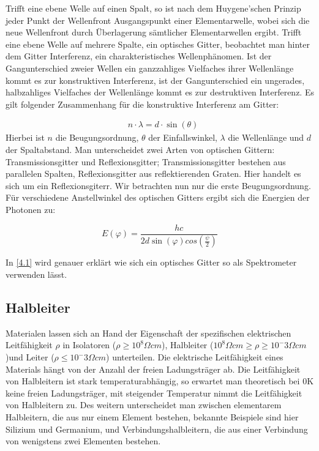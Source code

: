 \documentclass[12pt]{article}
\begin{document}
Trifft eine ebene Welle auf einen Spalt, so ist nach dem Huygene'schen Prinzip jeder Punkt der Wellenfront Ausgangspunkt einer Elementarwelle, wobei sich die neue Wellenfront durch Überlagerung sämtlicher Elementarwellen ergibt. Trifft eine ebene Welle auf mehrere Spalte, ein optisches Gitter, beobachtet man hinter dem Gitter Interferenz, ein charakteristisches Wellenphänomen.  Ist der Gangunterschied zweier Wellen ein ganzzahliges Vielfaches ihrer Wellenlänge kommt es zur konstruktiven Interferenz, ist der Gangunterschied ein ungerades, halbzahliges Vielfaches der Wellenlänge kommt es zur destruktiven Interferenz. Es gilt folgender Zusammenhang für die konstruktive Interferenz am Gitter:

\begin{align*}
& n\cdot\lambda=d\cdot\sin(\theta)
\end{align*}
Hierbei ist $n$ die Beugungsordnung, $\theta$ der Einfallswinkel, $\lambda$ die Wellenlänge und $d$ der Spaltabstand.
Man unterscheidet zwei Arten von optischen Gittern: Transmissionsgitter und Reflexionsgitter; Transmissionsgitter bestehen aus parallelen Spalten, Reflexionsgitter aus reflektierenden Graten. Hier handelt es sich um ein Reflexionsgiterr. Wir betrachten nun nur die erste Beugungsordnung. Für verschiedene Anstellwinkel des optischen Gitters ergibt sich die Energien der Photonen zu:

\[E(\varphi)=\frac{hc}{2d\sin(\varphi)cos(\frac{\psi}{2})}\]

In \ref{4.1} wird genauer erklärt wie sich ein optisches Gitter so als Spektrometer verwenden lässt.

\subsection{Halbleiter}

Materialen lassen sich an Hand der Eigenschaft der spezifischen elektrischen Leitfähigkeit $\rho$ in Isolatoren ($\rho \geq 10^8\Omega cm$), Halbleiter ($10^8\Omega cm \geq \rho \geq 10^-3 \Omega cm $)und Leiter ($\rho \leq 10^-3 \Omega cm$) unterteilen. Die elektrische Leitfähigkeit eines Materials hängt von der Anzahl der freien Ladungsträger ab. Die Leitfähigkeit von Halbleitern ist stark temperaturabhängig, so erwartet man theoretisch bei $0$K keine freien Ladungsträger, mit steigender Temperatur nimmt die Leitfähigkeit von Halbleitern zu. 
Des weitern unterscheidet man zwischen elementarem Halbleitern, die aus nur einem Element bestehen, bekannte Beispiele sind hier Silizium und Germanium, und Verbindungshalbleitern, die aus einer Verbindung von wenigstens  zwei Elementen bestehen. 
\end{document}
